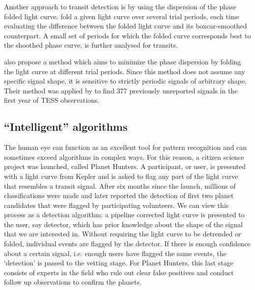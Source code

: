 Another approach to transit detection is by using the dispersion of the phase folded light curve. \cite{plavchan2008near} fold a given light curve over several trial periods, each time evaluating the difference between the folded light curve and its boxcar-smoothed counterpart. A small set of periods for which the folded curve corresponds best to the shoothed phase curve, is further analysed for transits.
   
\cite{wheeler2019weird} also propose a method which aims to minimize the phase dispersion by folding the light curve at different trial periods. Since this method does not assume any specific signal shape, it is sensitive to strictly periodic signals of arbitrary shape. Their method was applied by \cite{chakraborty2020hundreds} to find 377 previously unreported signals in the first year of TESS observations.


\subsection{``Intelligent'' algorithms}
The human eye can function as an excellent tool for pattern recognition and can sometimes exceed algorithms in complex ways.  For this reason, a citizen science project was launched, called Planet Hunters. A participant, or user, is presented with a light curve from Kepler and is asked to flag any part of the light curve that resembles a transit signal. After six months since the launch, millions of classifications were made and later \cite{fischer2012planet} reported the detection of first two planet candidates that were flagged by participating volunteers. We can view this process as a detection algorithm: a pipeline corrected light curve is presented to the user, say detector, which has prior knowledge about the shape of the signal that we are interested in. Without requiring the light curve to be detrended or folded, individual events are flagged by the detector. If there is enough confidence about a certain signal, i.e. enough users have flagged the same events, the `detection' is passed to the vetting stage. For Planet Hunters, this last stage consists of experts in the field who rule out clear false positives and conduct follow up observations to confirm the planets. 

